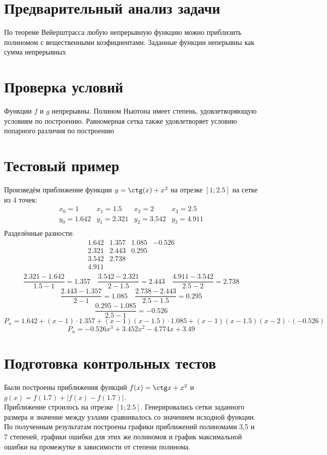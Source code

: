 \documentclass[a4paper]{article}
\begin{document}
\section{Предварительный анализ задачи}
По теореме Вейерштрасса любую непрерывную функцию можно приблизить полиномом с вещественными коэфициентами. Заданные
функции неперывны как сумма непрерывных
\section{Проверка условий}
Функции \(f\) и \(g\) непрерывны.
Полином Ньютона имеет степень, удовлетворяющую условиям по построению. Равномерная сетка также удовлетворяет условию попарного различия по построению
\section{Тестовый пример}
Произведём приближение функции $y = \ctg(x)+x^{2}$ на отрезке $[1;2.5]$ на сетке из 4 точек:\[
\begin{matrix}
x_{0} = 1& x_{1} = 1.5& x_{2} = 2& x_{3} = 2.5\\
y_{0} = 1.642& y_{1} = 2.321& y_{2} = 3.542& y_{3} = 4.911\\
\end{matrix}
\]
Разделённые разности: \[
  \begin{matrix}
    1.642 & 1.357 & 1.085 & -0.526\\
    2.321 & 2.443 & 0.295\\
    3.542 & 2.738\\
    4.911\\
  \end{matrix}
\]\[
  \frac{2.321 - 1.642}{1.5 - 1} = 1.357 \quad \frac{3.542 - 2.321}{2 - 1.5} = 2.443 \quad \frac{4.911 - 3.542}{2.5 - 2} = 2.738
\]\[
  \frac{2.443 - 1.357}{2 - 1} = 1.085 \quad \frac{2.738 - 2.443}{2.5 - 1.5} = 0.295
\]\[
  \frac{0.295 - 1.085}{2.5 - 1} = - 0.526
\]\[
  P_{n} = 1.642 + (x - 1)\cdot1.357 + (x-1)(x-1.5)\cdot1.085 + (x-1)(x-1.5)(x-2)\cdot(-0.526)
\]\[
  P_{n} = -0.526x^{3} + 3.452x^{2} - 4.774x + 3.49
\]
\section{Подготовка контрольных тестов}
Были построены приближения функций $f(x) = \ctg x + x^{2}$ и $g(x) = f(1.7) + |f(x) - f(1.7)|$.\\
Приближение строилось на отрезке $[1;2.5]$. Генерировались сетки заданного размера и значение между узлами сравнивалось со значением исходной функции.\\
По полученным результатам построены графики приближений полиномами 3,5 и 7 степеней, графики ошибки для этих же полиномов и график максимальной ошибки на промежутке в зависимости от степени полинома.
\end{document}
